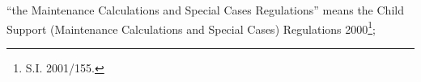 \documentclass[12pt,a4paper]{article}
\begin{document}
\begin{enumerate}
“the Maintenance Calculations and Special Cases Regulations” means the Child Support (Maintenance Calculations and Special Cases) Regulations 2000\footnote{\frenchspacing S.I. 2001/155.};


%


%
%


\end{enumerate}
\end{document}
